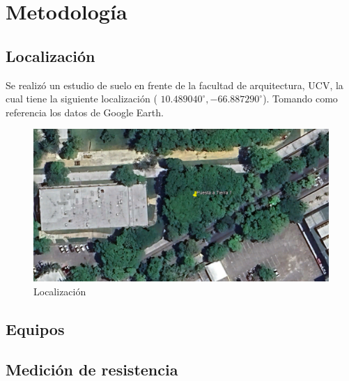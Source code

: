 \chapter{Metodología}

\section{Localización}
Se realizó un estudio de suelo en frente de la facultad de arquitectura, UCV, la cual tiene la siguiente localización ( $10.489040^{\circ}, -66.887290^{\circ}$). Tomando como referencia los datos de Google Earth.

\begin{figure}[H]
    \centering
    \includegraphics[scale=0.6]{Imagenes/localizacion.png}
    \caption{Localización}
    \label{local}
   \end{figure}

\section{Equipos}
\section{Medición de resistencia}